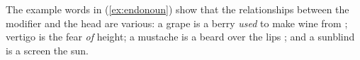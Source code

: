 
The example words in (\ref{ex:endonoun}) show that the relationships between 
the modifier and the head are various: a grape is a berry \emph{used} to 
make wine from \parencite[compare][702]{bauer2001}; vertigo is the fear 
\emph{of} height; a mustache is a beard  over the lips 
\parencite[702]{bauer2001}; and a sunblind is a screen  the 
sun.
